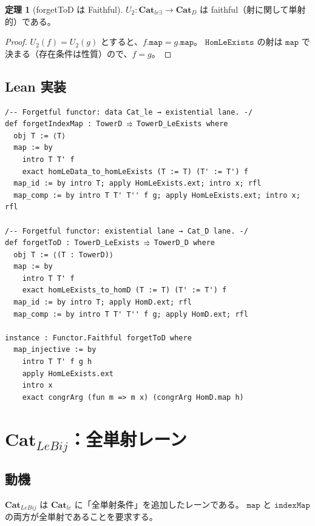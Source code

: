 \documentclass{ltjsarticle}
\theoremstyle{definition}
\newtheorem{theorem}[definition]{定理}
\newcommand{\catD}{\mathbf{Cat}_D}
\newcommand{\catle}{\mathbf{Cat}_{le}}
\newcommand{\catleexists}{\mathbf{Cat}_{le\exists}}
\newcommand{\catlebij}{\mathbf{Cat}_{LeBij}}
\newcommand{\HomLeExists}{\mathtt{HomLeExists}}
\newcommand{\indexMap}{\mathtt{indexMap}}
\begin{document}
\begin{theorem}[forgetToD は Faithful]
$U_2 : \catleexists \to \catD$ は faithful（射に関して単射的）である。
\end{theorem}

\begin{proof}
$U_2(f) = U_2(g)$ とすると、$f.\mathtt{map} = g.\mathtt{map}$。
$\HomLeExists$ の射は $\mathtt{map}$ で決まる（存在条件は性質）ので、$f = g$。
\end{proof}

\subsection{Lean 実装}

\begin{lstlisting}[caption=忘却関手の実装（Cat\_le\_functors.lean より）]
/-- Forgetful functor: data Cat_le → existential lane. -/
def forgetIndexMap : TowerD ⥤ TowerD_LeExists where
  obj T := ⟨T⟩
  map := by
    intro T T' f
    exact homLeData_to_homLeExists (T := T) (T' := T') f
  map_id := by intro T; apply HomLeExists.ext; intro x; rfl
  map_comp := by intro T T' T'' f g; apply HomLeExists.ext; intro x; rfl

/-- Forgetful functor: existential lane → Cat_D lane. -/
def forgetToD : TowerD_LeExists ⥤ TowerD_D where
  obj T := ⟨(T : TowerD)⟩
  map := by
    intro T T' f
    exact homLeExists_to_homD (T := T) (T' := T') f
  map_id := by intro T; apply HomD.ext; rfl
  map_comp := by intro T T' T'' f g; apply HomD.ext; rfl

instance : Functor.Faithful forgetToD where
  map_injective := by
    intro T T' f g h
    apply HomLeExists.ext
    intro x
    exact congrArg (fun m => m x) (congrArg HomD.map h)
\end{lstlisting}

\section{$\catlebij$：全単射レーン}

\subsection{動機}

$\catlebij$ は $\catle$ に「全単射条件」を追加したレーンである。
$\mathtt{map}$ と $\indexMap$ の両方が全単射であることを要求する。
\end{document}
